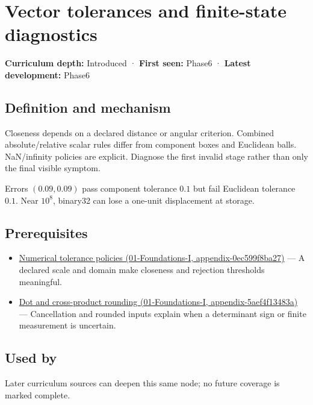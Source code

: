 \hypertarget{appendix-b5b83329215b}{}
\section{Vector tolerances and finite-state diagnostics}\label{appendix-b5b83329215b-vector-tolerances-and-finite-state-diagnostics}

\textbf{Curriculum depth:} Introduced · \textbf{First seen:} Phase6 · \textbf{Latest development:} Phase6

\subsection{Definition and mechanism}\label{appendix-b5b83329215b-definition-and-mechanism}

Closeness depends on a declared distance or angular criterion. Combined absolute/relative scalar rules differ from component boxes and Euclidean balls. NaN/infinity policies are explicit. Diagnose the first invalid stage rather than only the final visible symptom.

Errors \((0.09,0.09)\) pass component tolerance \(0.1\) but fail Euclidean tolerance \(0.1\). Near \(10^8\), binary32 can lose a one-unit displacement at storage.

\subsection{Prerequisites}\label{appendix-b5b83329215b-prerequisites}

\begin{itemize}
\tightlist
\item
  \href{../01-Foundations-I/main.pdf\#nameddest=appendix-0ec599f8ba27}{Numerical tolerance policies (01-Foundations-I, appendix-0ec599f8ba27)} --- A declared scale and domain make closeness and rejection thresholds meaningful.
\item
  \href{../01-Foundations-I/main.pdf\#nameddest=appendix-5aef4f13483a}{Dot and cross-product rounding (01-Foundations-I, appendix-5aef4f13483a)} --- Cancellation and rounded inputs explain when a determinant sign or finite measurement is uncertain.
\end{itemize}

\subsection{Used by}\label{appendix-b5b83329215b-used-by}

Later curriculum sources can deepen this same node; no future coverage is marked complete.

